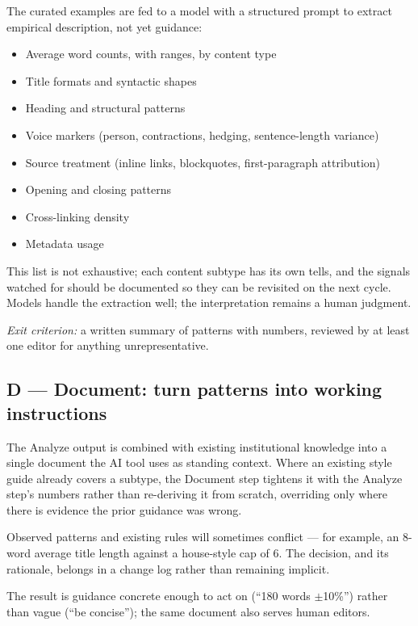 \documentclass[11pt]{article}
\begin{document}
The curated examples are fed to a model with a structured prompt to
extract empirical description, not yet guidance:

\begin{itemize}[nosep]
  \item Average word counts, with ranges, by content type
  \item Title formats and syntactic shapes
  \item Heading and structural patterns
  \item Voice markers (person, contractions, hedging, sentence-length
        variance)
  \item Source treatment (inline links, blockquotes, first-paragraph
        attribution)
  \item Opening and closing patterns
  \item Cross-linking density
  \item Metadata usage
\end{itemize}

This list is not exhaustive; each content subtype has its own tells,
and the signals watched for should be documented so they can be
revisited on the next cycle. Models handle the extraction well; the
interpretation remains a human judgment.

\emph{Exit criterion:} a written summary of patterns with numbers,
reviewed by at least one editor for anything unrepresentative.

\subsection{D --- Document: turn patterns into working instructions}

The Analyze output is combined with existing institutional knowledge
into a single document the AI tool uses as standing context. Where an
existing style guide already covers a subtype, the Document step
tightens it with the Analyze step's numbers rather than re-deriving it
from scratch, overriding only where there is evidence the prior
guidance was wrong.

Observed patterns and existing rules will sometimes conflict --- for
example, an 8-word average title length against a house-style cap of
6. The decision, and its rationale, belongs in a change log rather
than remaining implicit.

The result is guidance concrete enough to act on (``180 words
$\pm$10\%'') rather than vague (``be concise''); the same document also
serves human editors.
\end{document}
